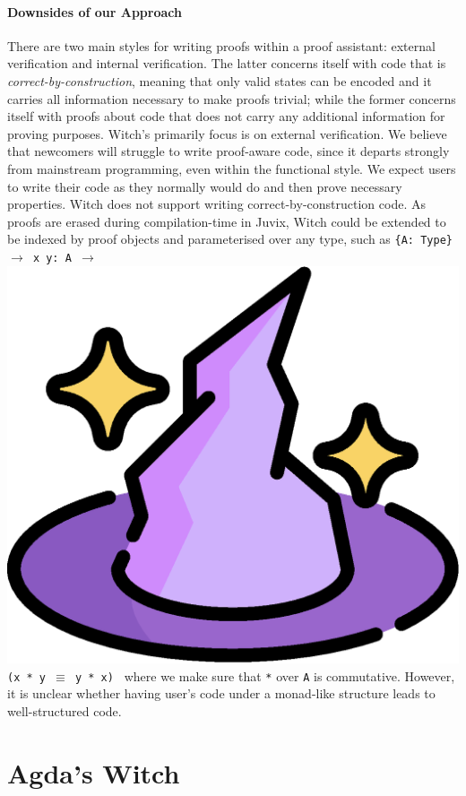 \documentclass[sigconfl]{acmart}
\begin{document}
\paragraph{Downsides of our Approach}
There are two main styles for writing proofs within a proof assistant: external
verification and internal verification. The latter concerns itself with code
that is \textit{correct-by-construction}, meaning that only valid states can be encoded and it
carries all information necessary to make proofs trivial; while the former
concerns itself with proofs about code that does not carry any additional
information for proving purposes.
Witch's primarily focus is on external verification. We believe that newcomers
will struggle to write proof-aware code, since it departs strongly from
mainstream programming, even within the functional style. We expect users to
write their code as they normally would do and then prove necessary properties.
Witch does not support writing correct-by-construction code. As proofs
are erased during compilation-time in Juvix, Witch could be extended
to be indexed by proof objects and parameterised over any type, such as
\texttt{\{A: Type\} $\rightarrow$ x y: A $\rightarrow$ }
\includegraphics[height=0.02\textheight]{image/hat.eps} \texttt{ (x * y $\equiv$
  y * x) } where we make sure that \texttt{*} over \texttt{A} is commutative.
However, it is unclear whether having user's code under a monad-like structure leads
to well-structured code.

\section{Agda's Witch} \label{witch-agda}
\end{document}
